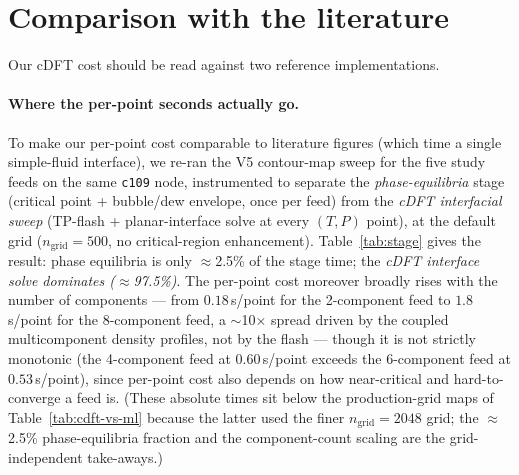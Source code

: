 \documentclass[11pt]{article}
\begin{document}
\section{Comparison with the literature}
Our cDFT cost should be read against two reference implementations.

\paragraph{Where the per-point seconds actually go.}
To make our per-point cost comparable to literature figures (which time a single
simple-fluid interface), we re-ran the V5 contour-map sweep for the five study
feeds on the same \texttt{c109} node, instrumented to separate the
\emph{phase-equilibria} stage (critical point + bubble/dew envelope, once per
feed) from the \emph{cDFT interfacial sweep} (TP-flash + planar-interface solve
at every $(T,P)$ point), at the default grid ($n_\mathrm{grid}=500$, no
critical-region enhancement). Table~\ref{tab:stage} gives the result: phase
equilibria is only $\approx$2.5\% of the stage time; the \emph{cDFT interface
solve dominates ($\approx$97.5\%)}. The per-point cost moreover broadly rises
with the number of components --- from $0.18$\,s/point for the 2-component feed
to $1.8$\,s/point for the 8-component feed, a $\sim$10$\times$ spread driven by
the coupled multicomponent density profiles, not by the flash --- though it is
not strictly monotonic (the 4-component feed at $0.60$\,s/point exceeds the
6-component feed at $0.53$\,s/point), since per-point cost also depends on how
near-critical and hard-to-converge a feed is.
(These absolute times sit below the production-grid maps of
Table~\ref{tab:cdft-vs-ml} because the latter used the finer $n_\mathrm{grid}=2048$
grid; the $\approx$2.5\% phase-equilibria fraction and the component-count
scaling are the grid-independent take-aways.)
\end{document}
